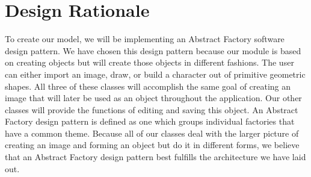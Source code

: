\documentclass[a4paper, 11pt]{article} %
\begin{document}

\section*{Design Rationale}

To create our model, we will be implementing an Abstract Factory software design pattern. We have chosen this design pattern because our module is based on creating objects but will create those objects in different fashions. The user can either import an image, draw, or build a character out of primitive geometric shapes. All three of these classes will accomplish the same goal of creating an image that will later be used as an object throughout the application. Our other classes will provide the functions of editing and saving this object. An Abstract Factory design pattern is defined as one which groups individual factories that have a common theme. Because all of our classes deal with the larger picture of creating an image and forming an object but do it in different forms, we believe that an Abstract Factory design pattern best fulfills the architecture we have laid out.

\end{document}
